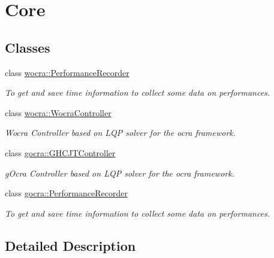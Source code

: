 \hypertarget{group__core}{}\section{Core}
\label{group__core}
\subsection*{Classes}
\begin{DoxyCompactItemize}
\item 
class \hyperlink{classwocra_1_1PerformanceRecorder}{wocra\+::\+Performance\+Recorder}
\begin{DoxyCompactList}\small\item\em To get and save time information to collect some data on performances. \end{DoxyCompactList}\item 
class \hyperlink{classwocra_1_1WocraController}{wocra\+::\+Wocra\+Controller}
\begin{DoxyCompactList}\small\item\em Wocra Controller based on L\+QP solver for the ocra framework. \end{DoxyCompactList}\item 
class \hyperlink{classgocra_1_1GHCJTController}{gocra\+::\+G\+H\+C\+J\+T\+Controller}
\begin{DoxyCompactList}\small\item\em g\+Ocra Controller based on L\+QP solver for the ocra framework. \end{DoxyCompactList}\item 
class \hyperlink{classgocra_1_1PerformanceRecorder}{gocra\+::\+Performance\+Recorder}
\begin{DoxyCompactList}\small\item\em To get and save time information to collect some data on performances. \end{DoxyCompactList}\end{DoxyCompactItemize}


\subsection{Detailed Description}
